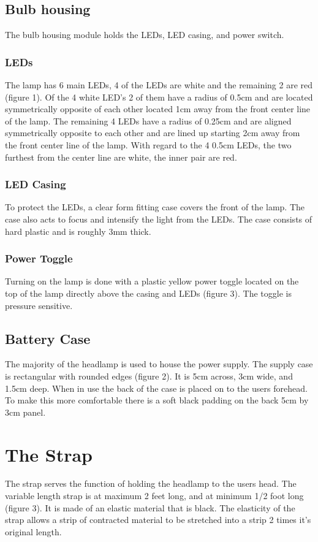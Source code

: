\documentclass[12pt]{article}
\begin{document}
\subsection{Bulb housing}
The bulb housing module holds the LEDs, LED casing, and power switch.

\subsubsection{LEDs}
The lamp has 6 main LEDs, 4 of the LEDs are white and the remaining 2 are red (figure 1). Of the 4
white LED's 2 of them have a radius of 0.5cm and are located symmetrically opposite of each other
located 1cm away from the front center line of the lamp.  The remaining 4 LEDs have a radius of
0.25cm and are aligned symmetrically opposite to each other and are lined up starting 2cm away from
the front center line of the lamp. With regard to the 4 0.5cm LEDs, the two furthest from the center
line are white, the inner pair are red.

\subsubsection{LED Casing}
To protect the LEDs, a clear form fitting case covers the front of the lamp.  The case also acts to
focus and intensify the light from the LEDs. The case consists of hard plastic and is roughly
3mm thick.

\subsubsection{Power Toggle}
Turning on the lamp is done with a plastic yellow power toggle located on the top of the lamp
directly above the casing and LEDs (figure 3). The toggle is pressure sensitive.

\subsection{Battery Case}
The majority of the headlamp is used to house the power supply. The supply case is rectangular with
rounded edges (figure 2). It is 5cm across, 3cm wide, and 1.5cm deep. When in use the back of the case is
placed on to the users forehead. To make this more comfortable there is a soft black padding on the
back 5cm by 3cm panel.

\section{The Strap}
The strap serves the function of holding the headlamp to the users head. The variable length strap
is at maximum 2 feet long, and at minimum 1/2 foot long (figure 3). It is made of an elastic material that
is black. The elasticity of the strap allows a strip of contracted material to be stretched into a
strip 2 times it's original length.
\end{document}
